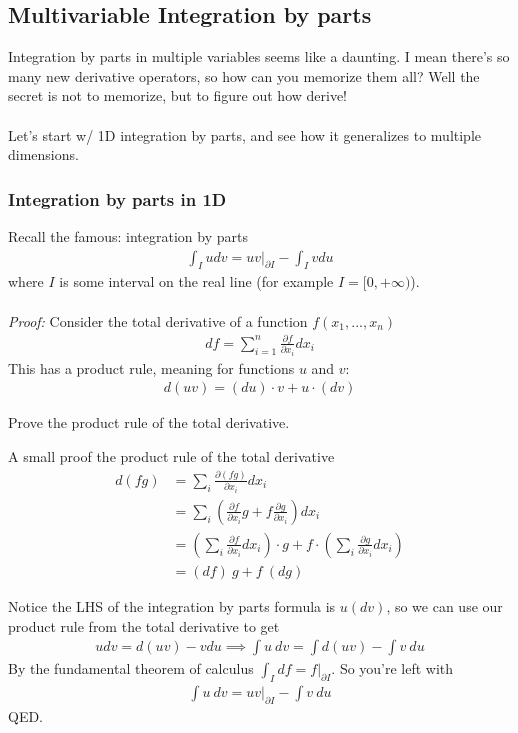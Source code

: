 \documentclass[12pt,fleqn]{article}
\numberwithin{equation}{section} %
\newcounter{problem}
\begin{document}
\subsection{Multivariable Integration by parts}
Integration by parts in multiple variables seems like a daunting. I mean there's so many new derivative operators, so how can you memorize them all? Well the secret is not to memorize, but to figure out how derive! \\
\\
Let's start w/ 1D integration by parts, and see how it generalizes to multiple dimensions.

\subsubsection{Integration by parts in 1D}
Recall the famous: integration by parts
\begin{align}
	\int_I u dv = u v \Big |_{\partial I} - \int_I v du
\end{align}
where $I$ is some interval on the real line (for example $I = [0, +\infty)$).\\
\\
\emph{Proof:}
Consider the total derivative of a function $f(x_1, ..., x_n)$
\begin{align}
	df = \sum_{i=1}^n \frac{\partial f}{\partial x_i} dx_i
\end{align}
This has a product rule, meaning for functions $u$ and $v$:
\begin{align}
	d(uv) = (du) \cdot  v + u \cdot (dv)
\end{align}
\begin{problem}
	Prove the product rule of the total derivative.
\end{problem}
\begin{sidework}
	A small proof the product rule of the total derivative 
	\begin{align}
		d(fg) & =  \sum_i \frac{\partial(fg)}{\partial x_i}  dx_i \\
		& = \sum_i \left(\frac{\partial f}{\partial x_i} g + f \frac{\partial g}{\partial x_i}\right)dx_i \\
		& = \left(\sum_i \frac{\partial f}{\partial x_i} dx_i  \right)\cdot  g + f \cdot \left(\sum_i \frac{\partial g}{\partial x_i} dx_i  \right)\\
		& = (df)~g + f~ (dg)
	\end{align}
\end{sidework}
Notice the LHS of the integration by parts formula is $u (dv)$, so we can use our product rule from the total derivative to get
\begin{align}
	u dv = d(uv) - v du \implies \int u ~dv = \int d(uv) - \int v ~du
\end{align}
By the fundamental theorem of calculus $\int_I df = f \Big|_{\partial I}$. So you're left with
\begin{align}
	\int u~ dv = uv \Big|_{\partial I} - \int v ~du
\end{align}
QED.
\end{document}
